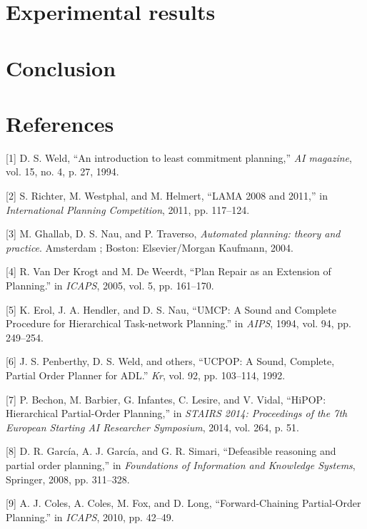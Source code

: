 \documentclass[]{article}
\begin{document}
\section{Experimental results}\label{experimental-results}

\section*{Conclusion}\label{conclusion}

\section*{References}\label{references}

\hypertarget{refs}{}
\hypertarget{ref-weldux5fintroductionux5f1994}{}
{[}1{]} D. S. Weld, ``An introduction to least commitment planning,''
\emph{AI magazine}, vol. 15, no. 4, p. 27, 1994.

\hypertarget{ref-richterux5flamaux5f2011}{}
{[}2{]} S. Richter, M. Westphal, and M. Helmert, ``LAMA 2008 and 2011,''
in \emph{International Planning Competition}, 2011, pp. 117--124.

\hypertarget{ref-ghallabux5fautomatedux5f2004}{}
{[}3{]} M. Ghallab, D. S. Nau, and P. Traverso, \emph{Automated
planning: theory and practice}. Amsterdam ; Boston: Elsevier/Morgan
Kaufmann, 2004.

\hypertarget{ref-vanux5fderux5fkrogtux5fplanux5f2005}{}
{[}4{]} R. Van Der Krogt and M. De Weerdt, ``Plan Repair as an Extension
of Planning.'' in \emph{ICAPS}, 2005, vol. 5, pp. 161--170.

\hypertarget{ref-erolux5fumcp:ux5f1994}{}
{[}5{]} K. Erol, J. A. Hendler, and D. S. Nau, ``UMCP: A Sound and
Complete Procedure for Hierarchical Task-network Planning.'' in
\emph{AIPS}, 1994, vol. 94, pp. 249--254.

\hypertarget{ref-penberthyux5fucpop:ux5f1992}{}
{[}6{]} J. S. Penberthy, D. S. Weld, and others, ``UCPOP: A Sound,
Complete, Partial Order Planner for ADL.'' \emph{Kr}, vol. 92, pp.
103--114, 1992.

\hypertarget{ref-bechonux5fhipop:ux5f2014}{}
{[}7{]} P. Bechon, M. Barbier, G. Infantes, C. Lesire, and V. Vidal,
``HiPOP: Hierarchical Partial-Order Planning,'' in \emph{STAIRS 2014:
Proceedings of the 7th European Starting AI Researcher Symposium}, 2014,
vol. 264, p. 51.

\hypertarget{ref-garciaux5fdefeasibleux5f2008}{}
{[}8{]} D. R. García, A. J. García, and G. R. Simari, ``Defeasible
reasoning and partial order planning,'' in \emph{Foundations of
Information and Knowledge Systems}, Springer, 2008, pp. 311--328.

\hypertarget{ref-colesux5fforward-chainingux5f2010}{}
{[}9{]} A. J. Coles, A. Coles, M. Fox, and D. Long, ``Forward-Chaining
Partial-Order Planning.'' in \emph{ICAPS}, 2010, pp. 42--49.
\end{document}
